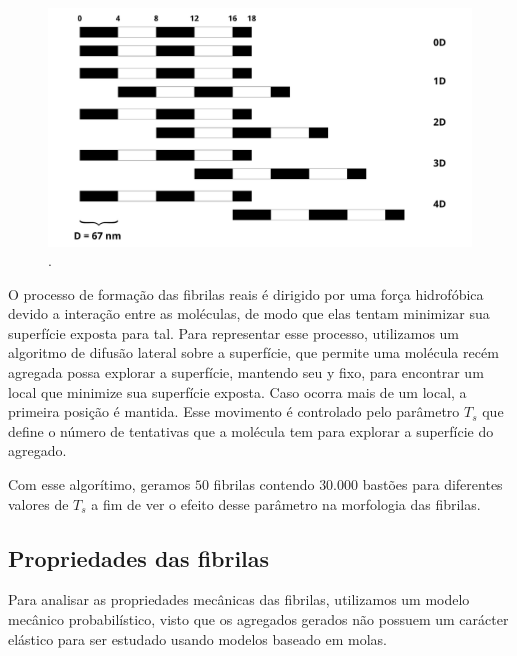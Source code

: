 \documentclass{article}
\begin{document}
        \begin{figure}[H]
            \centering
            \includegraphics[width=\textwidth]{figures/specific_bind.png}
    
            \caption{.} 
    
            \label{M2}
        \end{figure}

        O processo de formação das fibrilas reais é dirigido por uma força hidrofóbica devido a interação entre as moléculas, de modo que elas 
        tentam minimizar sua superfície exposta para tal\cite{Kadler1987,Parkinson1995}. Para representar esse processo, utilizamos um algoritmo
        de difusão lateral sobre a superfície, que permite uma molécula recém agregada possa explorar a superfície, mantendo seu y fixo, para 
        encontrar um local que minimize sua superfície exposta\cite{GarcaRuiz1991}. Caso ocorra mais de um local, a primeira posição é mantida. 
        Esse movimento é controlado pelo parâmetro $T_{s}$ que define o número de tentativas que a molécula tem para explorar a superfície do 
        agregado\cite{Parkinson1995}.
     

        Com esse algorítimo, geramos $50$ fibrilas contendo $30.000$ bastões para diferentes valores de $T_{s}$ a fim de ver o efeito desse 
        parâmetro na morfologia das fibrilas. 


    \subsection{Propriedades das fibrilas}
        
        Para analisar as propriedades mecânicas das fibrilas, utilizamos um modelo mecânico probabilístico, visto que os agregados gerados 
        não possuem um carácter elástico para ser estudado usando modelos baseado em molas\cite{Parkinson1997,Saitoh2020MolecularDS}. 
\end{document}
